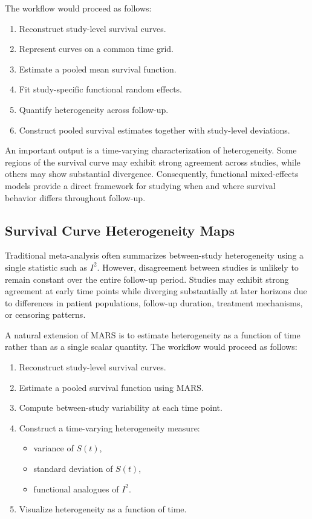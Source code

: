 \documentclass[11pt]{article}
\begin{document}
The workflow would proceed as follows:

\begin{enumerate}
\item Reconstruct study-level survival curves.
\item Represent curves on a common time grid.
\item Estimate a pooled mean survival function.
\item Fit study-specific functional random effects.
\item Quantify heterogeneity across follow-up.
\item Construct pooled survival estimates together with study-level deviations.
\end{enumerate}

An important output is a time-varying characterization of heterogeneity. Some regions of the survival curve may exhibit strong agreement across studies, while others may show substantial divergence. Consequently, functional mixed-effects models provide a direct framework for studying when and where survival behavior differs throughout follow-up.

\subsection{Survival Curve Heterogeneity Maps}

Traditional meta-analysis often summarizes between-study heterogeneity using a single statistic such as $I^2$. However, disagreement between studies is unlikely to remain constant over the entire follow-up period. Studies may exhibit strong agreement at early time points while diverging substantially at later horizons due to differences in patient populations, follow-up duration, treatment mechanisms, or censoring patterns.

A natural extension of MARS is to estimate heterogeneity as a function of time rather than as a single scalar quantity. The workflow would proceed as follows:

\begin{enumerate}
\item Reconstruct study-level survival curves.
\item Estimate a pooled survival function using MARS.
\item Compute between-study variability at each time point.
\item Construct a time-varying heterogeneity measure:
\begin{itemize}
\item variance of $S(t)$,
\item standard deviation of $S(t)$,
\item functional analogues of $I^2$.
\end{itemize}
\item Visualize heterogeneity as a function of time.
\end{enumerate}
\end{document}
